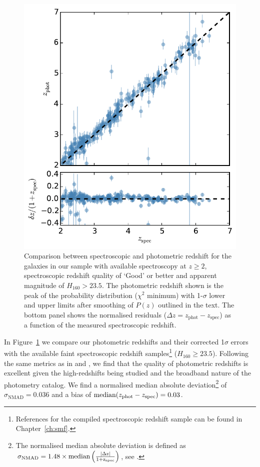 \begin{figure}
\centering
\includegraphics[width=0.85\columnwidth]{plots/specz_comparison.pdf}  
  \caption[Comparison between spectroscopic and photometric redshift for the galaxies in our sample.]{Comparison between spectroscopic and photometric redshift for the galaxies in our sample with available spectroscopy at $z \geq 2$, spectroscopic redshift quality of `Good' or better and apparent magnitude of $H_{160} > 23.5$. The photometric redshift shown is the peak of the probability distribution ($\chi^2$ minimum) with 1-$\sigma$ lower and upper limits after smoothing of $P(z)$ outlined in the text. The bottom panel shows the normalised residuals ($ \Delta z = z_{\text{phot}} - z_{\text{spec}}$) as a function of the measured spectroscopic redshift.}
  \label{merger-fig:specz_comp1}
\end{figure}

In Figure~\ref{merger-fig:specz_comp1} we compare our photometric redshifts and their corrected 1$\sigma$ errors with the available faint spectroscopic redshift samples\footnote{References for the compiled spectroscopic redshift sample can be found in Chapter~\ref{ch:smf}.} ($H_{160} \geq 23.5$). Following the same metrics as in \citet{Molino:2014iz} and , we find that the quality of photometric redshifts is excellent given the high-redshifts being studied and the broadband nature of the photometry catalog. We find a normalised median absolute deviation\footnote{The normalised median absolute deviation is defined as $\sigma_{\text{NMAD}} = 1.48 \times \rm{median} \left (  \frac{\left | \Delta z \right |}{1+z_{\rm{spec}}} \right )$, see \citet{Dahlen:2013eu}.} of $\sigma_{\text{NMAD}} = 0.036$ and a bias of $\text{median}(z_{\rm{phot}} - z_{\rm{spec}}) = 0.03$.

